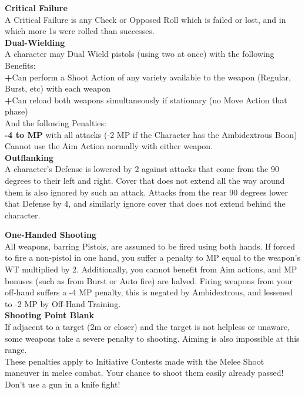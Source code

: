 \documentclass[a4paper, twocolumn, openany]{book}
\newlength{\indentlen}
\newcommand{\tabto}[1]{\setlength{\leftskip}{#1\indentlen}}
\begin{document}
{{\bfseries Critical Failure\\}
A Critical Failure is any Check or Opposed Roll which is failed or lost, and in which more 1s
were rolled than successes.\\

{\bfseries Dual-Wielding\\}
A character may Dual Wield pistols (using two at once) with the following Benefits:\\

	\tabto{1}\noindent
	{\bfseries +}Can perform a Shoot Action of any variety available to the weapon (Regular, Burst, etc) with
	each weapon\\
	{\bfseries +}Can reload both weapons simultaneously if stationary (no Move Action that phase)\\

	And the following Penalties:\\
	{\bfseries -4 to MP} with all attacks (-2 MP if the Character has the Ambidextrous Boon)
	Cannot use the Aim Action normally with either weapon.\\

\tabto{0}
{\bfseries Outflanking\\}
A character’s Defense is lowered by 2 against attacks that come from the 90 degrees to their
left and right. Cover that does not extend all the way around them is also ignored by such an
attack.
Attacks from the rear 90 degrees lower that Defense by 4, and similarly ignore cover that does
not extend behind the character.

{\bfseries One-Handed Shooting\\}
All weapons, barring Pistols, are assumed to be fired using both hands. If forced to fire a
non-pistol in one hand, you suffer a penalty to MP equal to the weapon’s WT multiplied by 2.
Additionally, you cannot benefit from Aim actions, and MP bonuses (such as from Burst or Auto
fire) are halved. Firing weapons from your off-hand suffers a -4 MP penalty, this is negated by
Ambidextrous, and lessened to -2 MP by Off-Hand Training.\\

{\bfseries Shooting Point Blank\\}
If adjacent to a target (2m or closer) and the target is not helpless or unaware, some weapons
take a severe penalty to shooting. Aiming is also impossible at this range.\\
These penalties apply to Initiative Contests made with the Melee Shoot maneuver in melee
combat. {Your chance to shoot them easily already passed!} {Don’t use a gun in a knife
fight!}\\

}
\end{document}
